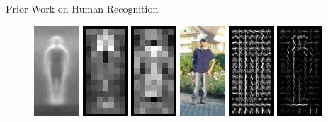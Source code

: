 \documentclass[mathserif]{beamer}
\begin{document}
\begin{frame}{Prior Work on Human Recognition}
    \begin{figure}
        \includegraphics[width=.12\textwidth]{illustrations/related_work/hog_dalal05_1}
        \includegraphics[width=.12\textwidth]{illustrations/related_work/hog_dalal05_2}
        \includegraphics[width=.12\textwidth]{illustrations/related_work/hog_dalal05_3}
        \includegraphics[width=.12\textwidth]{illustrations/related_work/hog_dalal05_4}
        \includegraphics[width=.12\textwidth]{illustrations/related_work/hog_dalal05_5}
        \includegraphics[width=.12\textwidth]{illustrations/related_work/hog_dalal05_6}

\end{figure}
\end{frame}
\end{document}

